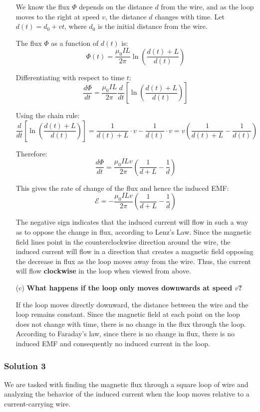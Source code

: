 \documentclass{article}
\begin{document}
\begin{enumerate}
    We know the flux $\Phi$ depends on the distance $d$ from the wire, and as the loop moves to the right at speed $v$, the distance $d$ changes with time. Let $d(t) = d_0 + vt$, where $d_0$ is the initial distance from the wire.
    
    The flux $\Phi$ as a function of $d(t)$ is:
    \[
    \Phi(t) = \frac{\mu_0 I L}{2\pi} \ln \left( \frac{d(t) + L}{d(t)} \right)
    \]
    
    Differentiating with respect to time $t$:
    \[
    \frac{d\Phi}{dt} = \frac{\mu_0 I L}{2\pi} \frac{d}{dt} \left[ \ln \left( \frac{d(t) + L}{d(t)} \right) \right]
    \]
    
    Using the chain rule:
    \[
    \frac{d}{dt} \left[ \ln \left( \frac{d(t) + L}{d(t)} \right) \right] = \frac{1}{d(t) + L} \cdot v - \frac{1}{d(t)} \cdot v = v \left( \frac{1}{d(t) + L} - \frac{1}{d(t)} \right)
    \]
    
    Therefore:
    \[
    \frac{d\Phi}{dt} = \frac{\mu_0 I L v}{2\pi} \left( \frac{1}{d + L} - \frac{1}{d} \right)
    \]
    
    This gives the rate of change of the flux and hence the induced EMF:
    \[
    \mathcal{E} = - \frac{\mu_0 I L v}{2\pi} \left( \frac{1}{d + L} - \frac{1}{d} \right)
    \]
    
    The negative sign indicates that the induced current will flow in such a way as to oppose the change in flux, according to Lenz's Law. Since the magnetic field lines point in the counterclockwise direction around the wire, the induced current will flow in a direction that creates a magnetic field opposing the decrease in flux as the loop moves away from the wire. Thus, the current will flow \textbf{clockwise} in the loop when viewed from above.

    \item[(c)] \textbf{What happens if the loop only moves downwards at speed $v$?}
    
    If the loop moves directly downward, the distance between the wire and the loop remains constant. Since the magnetic field at each point on the loop does not change with time, there is no change in the flux through the loop. According to Faraday’s law, since there is no change in flux, there is no induced EMF and consequently no induced current in the loop.
\end{enumerate}

\subsubsection{Solution 3}
We are tasked with finding the magnetic flux through a square loop of wire and analyzing the behavior of the induced current when the loop moves relative to a current-carrying wire.
\end{document}
